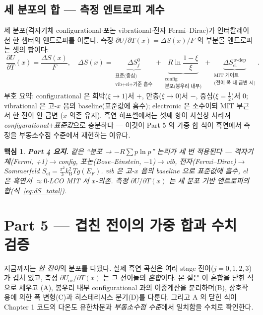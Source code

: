 \documentclass[11pt,a4paper]{article}
\newtheorem*{keybox}{핵심}
\newcommand{\oc}{\mathrm{oc}}
\newcommand{\elc}{\mathrm{el}}
\newcommand{\kB}{k_{\mathrm B}}
\begin{document}
\subsection{세 분포의 합 — 측정 엔트로피 계수}\label{sec:three_sum}
세 분포(격자기체 configurational$\cdot$포논 vibrational$\cdot$전자 Fermi--Dirac)가 인터칼레이션 한 챕터의
엔트로피를 이룬다. 측정 $\partial U/\partial T(x)=\Delta S(x)/F$ 의 부분몰 엔트로피는 셋의 합이다:
\begin{equation}
\boxed{\;
\frac{\partial U}{\partial T}(x)=\frac{\Delta S(x)}{F},\quad
\Delta S(x)=\underbrace{\Delta S^0_j}_{\substack{\text{표준(중심)}\\ \text{vib+el+기준 흡수}}}
          +\underbrace{R\ln\frac{1-\xi}{\xi}}_{\substack{\text{config}\\ \text{분포(봉우리 내부)}}}
          +\underbrace{\Delta S_\elc^{\,x\text{-dep}}}_{\substack{\text{MIT 게이트}\\ \text{(전이 폭 내 급변 시)}}}.
\;}
\label{eq:dS_total}
\end{equation}
부호 요약: configurational 은 희박($\xi\to1$)서 $+$, 만충($\xi\to0$)서 $-$, 중심($\xi=\tfrac12$)서 $0$;
vibrational 은 고-$x$ 음의 baseline(표준값에 흡수); electronic 은 소수이되 MIT 부근서 한 전이 안 급변
($x$-의존 유지). 흑연 하프셀에서는 셋째 항이 사실상 사라져 \emph{configurational$+$표준값}으로 충분하다
— 이것이 Part 5 의 가중 합 식이 흑연에서 측정을 부동소수점 수준에서 재현하는 이유다.

\begin{keybox}
\textbf{Part 4 요지.} 같은 ``분포 → $-R\sum p\ln p$'' 논리가 세 번 적용된다 — 격자기체(Fermi, +1)$\to$config,
포논(Bose--Einstein, $-1$)$\to$vib, 전자(Fermi--Dirac)$\to$Sommerfeld $S_\elc=\tfrac{\pi^2}{3}\kB^2 T g(E_F)$.
vib 은 고-$x$ 음의 baseline 으로 표준값에 흡수, el 은 흑연서 $\approx0$$\cdot$LCO MIT 서 $x$-의존. 측정
$\partial U/\partial T(x)$ 는 세 분포 기반 엔트로피의 합(식~\eqref{eq:dS_total}).
\end{keybox}

\section*{Part 5 — 겹친 전이의 가중 합과 수치 검증}

지금까지는 \emph{한 전이}의 분포를 다뤘다. 실제 흑연 곡선은 여러 stage 전이($j=0,1,2,3$)가 겹쳐 있고,
측정 $\partial U_\oc/\partial T(x)$ 는 그 전이들의 \emph{혼합}이다. 본 절은 이 혼합을 닫힌 식으로 세우고
(A), 봉우리 내부 configurational 과의 이중계산을 분리하며(B), 상호작용에 의한 폭 변형(C)과 히스테리시스
분기(D)를 다룬다. 그리고 A 의 닫힌 식이 Chapter 1 코드의 다온도 유한차분과 \emph{부동소수점 수준}에서
일치함을 수치로 확인한다.
\end{document}
